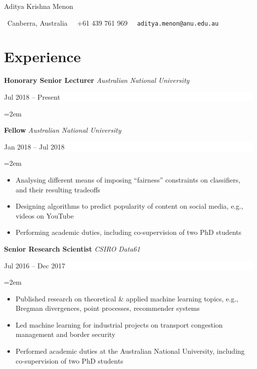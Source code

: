 \documentclass[fontsize=11pt]{article}
\newcommand{\MyName}[1]{ %
    \LARGE \usefont{OT1}{phv}{b}{n}
    \begin{center}
        #1
    \end{center}
    \normalsize \normalfont}
\newcommand{\NewPart}[1]{\section*{#1}}
\newcommand{\EducationEntry}[4]{
    \noindent \textbf{#1}
    \textit{#3}
    \hfill      %
    \colorbox{White}{
      \parbox{9em}{
      \hfill\color{Black}#2}} \par  %
    \noindent\hangindent=2em\hangafter=0 \small #4 %
    \normalsize \par}
\newcommand{\WorkEntry}[4]{       %
    \noindent
    \textbf{#1}
    \textit{#3} %
    \hfill      %
    \colorbox{White}{%
      \parbox{9em}{%
      \hfill\color{Black}#2}} \par   %
    \noindent\hangindent=2em\hangafter=0 \small #4 %
    \normalsize \par}
\begin{document}
    
\MyName{Aditya Krishna Menon}
{\par
\begin{center}
    {\small{\small\faMapMarker}\ Canberra, Australia}
    $\ $
    {\small{\small\phone}\ +61 439 761 969}
    $\ $
    {\small\tt{\small\Letter}\ aditya.menon@anu.edu.au}    
\end{center}
\par}



\NewPart{Experience}{}

\WorkEntry
{Honorary Senior Lecturer}
{Jul 2018 -- Present}
{Australian National University}{\vspace{-\baselineskip}}
\WorkEntry
{Fellow}
{Jan 2018 -- Jul 2018}
{Australian National University}
{
\begin{itemize} \itemsep -1pt
    \item Analysing different means of imposing ``fairness'' constraints on classifiers, and their resulting tradeoffs 

    \item Designing algorithms to predict popularity of content on social media, e.g., videos on YouTube

    \item Performing academic duties, including co-supervision of two PhD students
\end{itemize}
}

\WorkEntry
{Senior Research Scientist}
{Jul 2016 -- Dec 2017}
{CSIRO Data61}
{
\begin{itemize} \itemsep -1pt
        \item
            Published research on theoretical \& applied machine learning topics, e.g., Bregman divergences, point processes, recommender systems

        \item
            Led machine learning for industrial projects on {transport congestion management} and {border security}

        \item
            Performed academic duties at the Australian National University, including co-supervision of two PhD students
\end{itemize}
}
\end{document}
